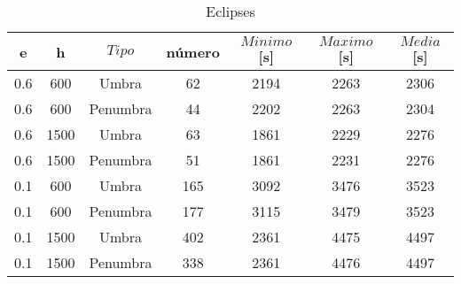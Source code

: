 \begin{table}[H] 
\centering 
\captionsetup{justification=centering,margin=10mm} 
\caption{Eclipses} 
	{\renewcommand{\arraystretch}{1.2} 
	\begin{tabular}{ccccccc} 
		e & h & $Tipo$ & número & $Minimo$ [s] & $Maximo$ [s] & $Media$ [s] \\ 
		\hline 
		0.6 & 600 & Umbra & 62 & 2194 & 2263 & 2306 \\ 
		0.6 & 600 & Penumbra & 44 & 2202 & 2263 & 2304 \\ 
		0.6 & 1500 & Umbra & 63 & 1861 & 2229 & 2276 \\ 
		0.6 & 1500 & Penumbra & 51 & 1861 & 2231 & 2276 \\ 
		0.1 & 600 & Umbra & 165 & 3092 & 3476 & 3523 \\ 
		0.1 & 600 & Penumbra & 177 & 3115 & 3479 & 3523 \\ 
		0.1 & 1500 & Umbra & 402 & 2361 & 4475 & 4497 \\ 
		0.1 & 1500 & Penumbra & 338 & 2361 & 4476 & 4497 \\ 
		\hline 
	\end{tabular} 
	} 
\label{tab:Eclipses} 
\end{table}